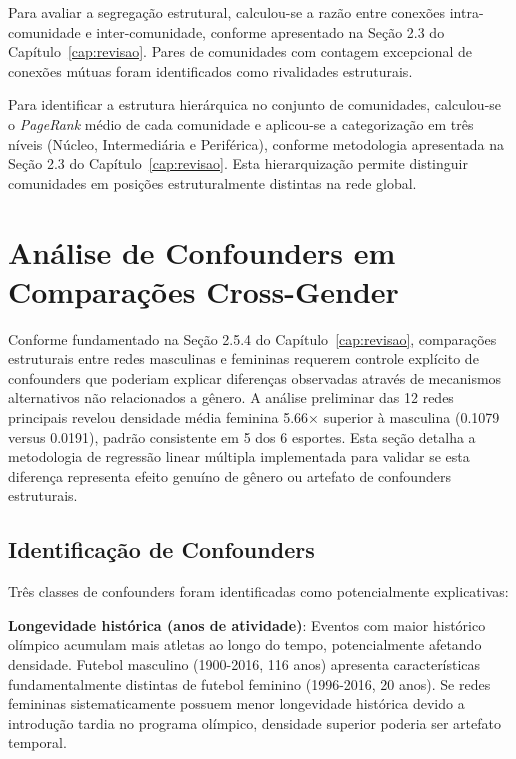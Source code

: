 Para avaliar a segregação estrutural, calculou-se a razão entre conexões intra-comunidade e inter-comunidade, conforme apresentado na Seção 2.3 do Capítulo~\ref{cap:revisao}. Pares de comunidades com contagem excepcional de conexões mútuas foram identificados como rivalidades estruturais.

Para identificar a estrutura hierárquica no conjunto de comunidades, calculou-se o \textit{PageRank} médio de cada comunidade e aplicou-se a categorização em três níveis (Núcleo, Intermediária e Periférica), conforme metodologia apresentada na Seção 2.3 do Capítulo~\ref{cap:revisao}. Esta hierarquização permite distinguir comunidades em posições estruturalmente distintas na rede global.

\section{Análise de Confounders em Comparações Cross-Gender}
\label{sec:confounder_methodology}

Conforme fundamentado na Seção 2.5.4 do Capítulo~\ref{cap:revisao}, comparações estruturais entre redes masculinas e femininas requerem controle explícito de confounders que poderiam explicar diferenças observadas através de mecanismos alternativos não relacionados a gênero. A análise preliminar das 12 redes principais revelou densidade média feminina 5.66× superior à masculina (0.1079 versus 0.0191), padrão consistente em 5 dos 6 esportes. Esta seção detalha a metodologia de regressão linear múltipla implementada para validar se esta diferença representa efeito genuíno de gênero ou artefato de confounders estruturais.

\subsection{Identificação de Confounders}

Três classes de confounders foram identificadas como potencialmente explicativas:

\textbf{Longevidade histórica (anos de atividade)}: Eventos com maior histórico olímpico acumulam mais atletas ao longo do tempo, potencialmente afetando densidade. Futebol masculino (1900-2016, 116 anos) apresenta características fundamentalmente distintas de futebol feminino (1996-2016, 20 anos). Se redes femininas sistematicamente possuem menor longevidade histórica devido a introdução tardia no programa olímpico, densidade superior poderia ser artefato temporal.

